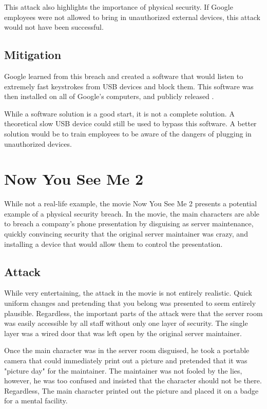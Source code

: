 \documentclass[acmsmall]{acmart}
\begin{document}
This attack also highlights the importance of physical security. If Google employees
were not allowed to bring in unauthorized external devices, this attack would not
have been successful.

\subsection{Mitigation}
Google learned from this breach and created a software that would listen to extremely
fast keystrokes from USB devices and block them. This software was then installed
on all of Google's computers, and publicly released \cite{Google02}.

While a software solution is a good start, it is not a complete solution. A theoretical
slow USB device could still be used to bypass this software. A better solution would
be to train employees to be aware of the dangers of plugging in unauthorized devices.

\section{Now You See Me 2}
While not a real-life example, the movie Now You See Me 2 \cite{NowYouSeeMe2} presents
a potential example of a physical security breach. In the movie, the main characters
are able to breach a company's phone presentation by disguising as server maintenance,
quickly convincing security that the original server maintainer was crazy, and
installing a device that would allow them to control the presentation.

\subsection{Attack}
While very entertaining, the attack in the movie is not entirely realistic. Quick uniform
changes and pretending that you belong was presented to seem entirely plausible. Regardless,
the important parts of the attack were that the server room was easily accessible by all staff
without only one layer of security. The single layer was a wired door that was left open
by the original server maintainer.

Once the main character was in the server room disguised, he took a portable camera that could
immediately print out a picture and pretended that it was "picture day" for the maintainer.
The maintainer was not fooled by the lies, however, he was too confused and insisted that the
character should not be there. Regardless, The main character printed out the picture and
placed it on a badge for a mental facility.
\end{document}
